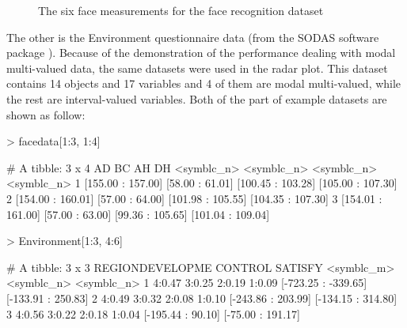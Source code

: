 \documentclass[article]{jss}
\begin{document}
\begin{figure}[htbp]
\centering
{}
\caption{\label{fig:face} The six face measurements for the face recognition dataset}
\end{figure}

The other is the Environment questionnaire data (from the SODAS software package \cite{diday:2008}). Because of the demonstration of the performance dealing with modal multi-valued data, the same datasets were used in the radar plot. This dataset contains 14 objects and 17 variables and 4 of them are modal multi-valued, while the rest are interval-valued variables. Both of the part of example datasets are shown as follow:

\begin{Schunk}
\begin{Sinput}
> facedata[1:3, 1:4]
\end{Sinput}
\begin{Soutput}
# A tibble: 3 x 4
                 AD              BC                AH                DH
         <symblc_n>      <symblc_n>        <symblc_n>        <symblc_n>
1 [155.00 : 157.00] [58.00 : 61.01] [100.45 : 103.28] [105.00 : 107.30]
2 [154.00 : 160.01] [57.00 : 64.00] [101.98 : 105.55] [104.35 : 107.30]
3 [154.01 : 161.00] [57.00 : 63.00]  [99.36 : 105.65] [101.04 : 109.04]
\end{Soutput}
\begin{Sinput}
> Environment[1:3, 4:6]
\end{Sinput}
\begin{Soutput}
# A tibble: 3 x 3
              REGIONDEVELOPME             CONTROL            SATISFY
                   <symblc_m>          <symblc_n>         <symblc_n>
1 4:0.47 3:0.25 2:0.19 1:0.09 [-723.25 : -339.65] [-133.91 : 250.83]
2 4:0.49 3:0.32 2:0.08 1:0.10  [-243.86 : 203.99] [-134.15 : 314.80]
3 4:0.56 3:0.22 2:0.18 1:0.04   [-195.44 : 90.10]  [-75.00 : 191.17]
\end{Soutput}
\end{Schunk}
\end{document}
